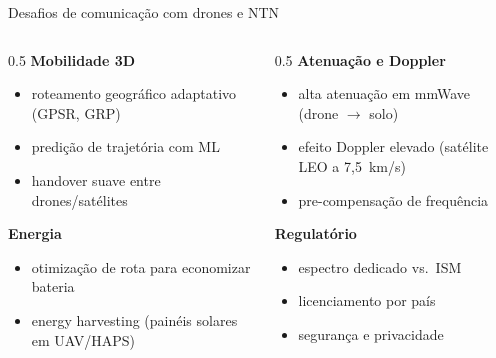 \documentclass[aspectratio=169,11pt]{beamer}
\begin{document}
\begin{frame}{Desafios de comunicação com drones e NTN}
  \begin{columns}
    \begin{column}{0.5\textwidth}
      \textbf{Mobilidade 3D}
      \begin{itemize}
        \item roteamento geográfico adaptativo (GPSR, GRP)
        \item predição de trajetória com ML
        \item handover suave entre drones/satélites
      \end{itemize}
      \textbf{Energia}
      \begin{itemize}
        \item otimização de rota para economizar bateria
        \item energy harvesting (painéis solares em UAV/HAPS)
      \end{itemize}
    \end{column}
    \begin{column}{0.5\textwidth}
      \textbf{Atenuação e Doppler}
      \begin{itemize}
        \item alta atenuação em mmWave (drone $\rightarrow$ solo)
        \item efeito Doppler elevado (satélite LEO a 7,5~km/s)
        \item pre-compensação de frequência
      \end{itemize}
      \textbf{Regulatório}
      \begin{itemize}
        \item espectro dedicado vs.\ ISM
        \item licenciamento por país
        \item segurança e privacidade
      \end{itemize}
    \end{column}
  \end{columns}
\end{frame}
\end{document}
